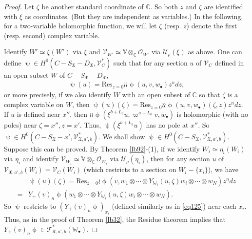 \documentclass[12pt,a4paper,notitlepage]{report}
\theoremstyle{definition}
\theoremstyle{plain}
\newcommand{\fk}{\mathfrak}
\newcommand{\mc}{\mathcal}
\newcommand{\Res}{\mathrm{Res}}
\newcommand{\scr}{\mathscr}
\newcommand{\SX}{S_{\fk X}}
\newcommand{\DX}{D_{\fk X}}
\newcommand{\blt}{\bullet}
\newcommand{\Vbb}{\mathbb V}
\newcommand{\Wbb}{\mathbb W}
\newcommand{\Cbb}{\mathbb C}
\numberwithin{equation}{section}
\begin{document}
\begin{proof}
Let $\zeta$ be another standard coordinate of $\Cbb$. So both $z$ and $\zeta$ are identified with $\xi$ as coordinates. (But they are independent as variables.) In the following, for a two-variable holomorphic function, we will let $\zeta$ (resp. $z$) denote the first (resp. second) complex variable.

Identify $W'\simeq\xi(W')$ via $\xi$ and  $\scr V_{W'}\simeq\Vbb\otimes_\Cbb\scr O_{W'}$ via $\mc U_\varrho(\xi)$ as above. One can define $\uppsi\in H^0(C-\SX-\DX,\scr V_C^*)$ such that for any section $u$ of $\scr V_C$ defined in an open subset $W$ of $C-\SX-\DX$,
\begin{align*}
\uppsi(u)=\Res_{z=0}\wr\wr\upphi(u, v,w_\blt)z^ndz,
\end{align*}
or more precisely, if we also identify $W$ with an open subset of $\Cbb$ so that $\zeta$ is a complex variable on $W$, then $\uppsi(u)(\zeta)=\Res_{z=0}\wr\wr\upphi(u, v,w_\blt)(\zeta,z)z^ndz$. If $u$ is defined near $x''$, then $\wr\wr\upphi(\xi^{b+L_0}u, \varpi^{a+L_0}v,w_\blt)$ is holomorphic (with no poles) near $\zeta=x'',z=x'$. Thus, $\uppsi(\xi^{b+L_0}u)$ has no  pole at $x''$. So $\uppsi\in H^0(C-\SX-x',\scr V_{\fk X,a',b}^*)$. We shall show $\uppsi\in H^0(C-\SX,\scr V_{\fk X,a',b}^*)$. Suppose this can be proved. By Theorem \ref{lb92}-(1), if we identify $W_i\simeq \eta_i(W_i)$ via $\eta_i$ and identify $\scr V_{W_i}\simeq\Vbb\otimes_\Cbb\scr O_{W_i}$ via $\mc U_\varrho(\eta_i)$, then for any section $u$ of $\scr V_{\fk X,a',b}(W_i)=\scr V_C(W_i)$  (which restricts to a section on $W_i-\{x_i\}$), we have
\begin{align*}
&\uppsi(u)(\zeta)=\Res_{z=0}\wr\upphi(v,w_1\otimes\cdots\otimes Y_{\Wbb_i}(u,\zeta)w_i\otimes\cdots\otimes w_N)z^ndz\\
=&Y_+(v)_n\upphi(w_1\otimes\cdots\otimes Y_{\Wbb_i}(u,\zeta)w_i\otimes\cdots\otimes w_N).
\end{align*}
So $\uppsi$ restricts to $(Y_+(v)_n\upphi)_{x_i}$ (defined similarly as in \eqref{eq125}) near each $x_i$. Thus, as in the proof of Theorem \ref{lb32}, the Residue theorem implies that $Y_+(v)_n\upphi\in \scr T_{\fk X,a',b}^*(\Wbb_\blt)$.


\end{proof}
\end{document}
